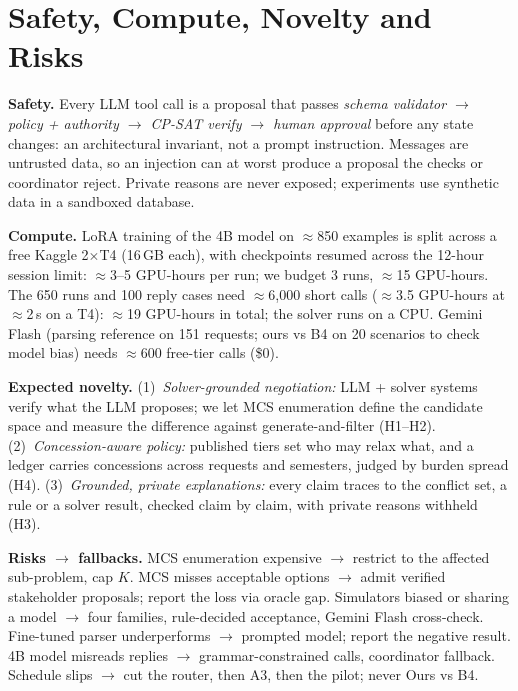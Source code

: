 \documentclass[11pt,a4paper]{article}
\begin{document}
\section{Safety, Compute, Novelty and Risks}
\small
\begin{tcolorbox}[enhanced,colback=lightblue,colframe=boxblue,boxrule=0.8pt,
  arc=3pt,left=6pt,right=6pt,top=2pt,bottom=2pt]
\small
\textbf{Safety.} Every LLM tool call is a proposal that passes \emph{schema validator $\to$
policy + authority $\to$ CP-SAT verify $\to$ human approval} before any
state changes: an architectural invariant, not a prompt
instruction. Messages are untrusted data, so an injection can at worst
produce a proposal the checks or coordinator reject. Private reasons are
never exposed; experiments use synthetic data in a sandboxed database.
\end{tcolorbox}
\medskip\noindent\textbf{Compute.} LoRA training of the 4B model on $\approx$850 examples is
split across a free Kaggle 2$\times$T4 (16\,GB each), with checkpoints
resumed across the 12-hour session limit: $\approx$3--5 GPU-hours per run;
we budget 3 runs, $\approx$15 GPU-hours. The 650 runs and 100 reply cases need
$\approx$6{,}000 short calls ($\approx$3.5 GPU-hours at $\approx$2\,s on a
T4): $\approx$19 GPU-hours in total; the solver runs on a CPU.
Gemini Flash (parsing reference on 151 requests; ours vs B4
on 20 scenarios to check model bias) needs $\approx$600 free-tier calls (\$0).

\medskip\noindent\textbf{Expected novelty.} (1)~\emph{Solver-grounded negotiation:}
LLM + solver systems verify what the LLM proposes; we let MCS enumeration
define the candidate space and measure the difference against
generate-and-filter (H1--H2). (2)~\emph{Concession-aware policy:} published
tiers set who may relax what, and a ledger carries concessions across
requests and semesters, judged by burden spread (H4). (3)~\emph{Grounded,
private explanations:} every claim traces to the conflict set, a rule or a
solver result, checked claim by claim, with private reasons withheld (H3).

\medskip\noindent\textbf{Risks $\to$ fallbacks.} MCS enumeration expensive $\to$
restrict to the affected sub-problem, cap $K$. MCS misses acceptable options
$\to$ admit verified stakeholder proposals; report the loss via oracle gap.
Simulators biased or sharing a model $\to$ four families, rule-decided
acceptance, Gemini Flash cross-check. Fine-tuned parser underperforms $\to$
prompted model; report the negative result. 4B model misreads replies
$\to$ grammar-constrained calls, coordinator fallback. Schedule slips $\to$ cut the
router, then A3, then the pilot; never Ours vs B4.
\end{document}
